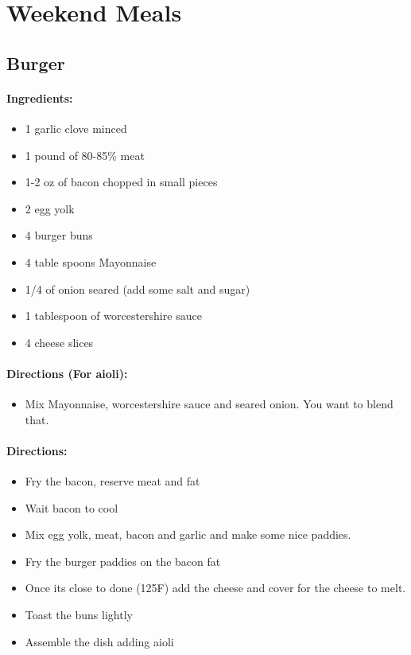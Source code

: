 \documentclass{article}
\begin{document}
\section{Weekend Meals}

\subsection{Burger}

\paragraph{Ingredients:}

\begin{itemize}
	\item 1 garlic clove minced
	\item 1 pound of 80-85\% meat
	\item 1-2 oz of bacon chopped in small pieces
	\item 2 egg yolk
	\item 4 burger buns
	\item 4 table spoons Mayonnaise
	\item 1/4 of onion seared (add some salt and sugar)
	\item 1 tablespoon of worcestershire sauce
	\item 4 cheese slices
\end{itemize}

\paragraph{Directions (For aioli):}
\begin{itemize}
	\item Mix Mayonnaise, worcestershire sauce and seared onion. You want to blend that.
\end{itemize}

\paragraph{Directions:}
\begin{itemize}
	\item Fry the bacon, reserve meat and fat
	\item Wait bacon to cool
	\item Mix egg yolk, meat, bacon and garlic and make some nice paddies.
	\item Fry the burger paddies on the bacon fat
	\item Once its close to done (125F) add the cheese and cover for the cheese to melt.
	\item Toast the buns lightly
	\item Assemble the dish adding aioli
\end{itemize}
\end{document}
